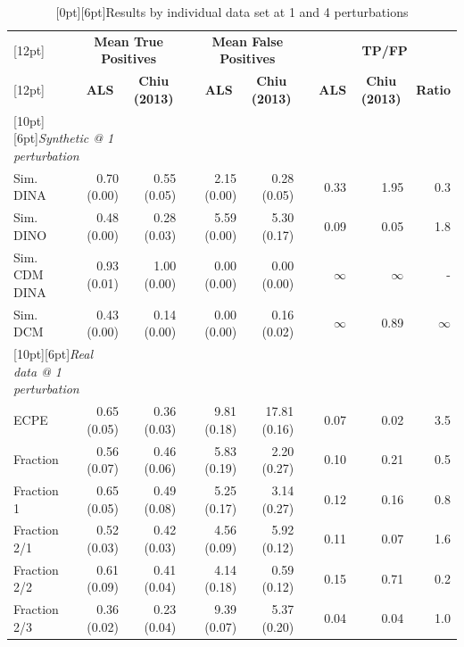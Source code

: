 \begin{table} 
  \caption{\protect\raisebox{0pt}[0pt][6pt]{Results by individual data set at 1 and 4 perturbations}}
  \label{tab:details}
\centering
\begin{tabular}{lrrrrrrrrr}
  \hline
  \hline
\raisebox{0pt}[12pt]{~}  & \multicolumn{2}{c}{\textbf{Mean True Positives}} && \multicolumn{2}{c}{\textbf{Mean False Positives}} && \multicolumn{3}{c}{\textbf{TP/FP}}\\
  \cline{2-3} \cline{5-6} \cline{8-10}
\raisebox{0pt}[12pt]{~}   
& \multicolumn{1}{c}{\textbf{ALS}} 
& \multicolumn{1}{c}{\textbf{Chiu (2013)}} 
&
& \multicolumn{1}{c}{\textbf{ALS}} 
& \multicolumn{1}{c}{\textbf{Chiu (2013)}} 
&
& \multicolumn{1}{c}{\textbf{ALS}} 
& \multicolumn{1}{c}{\textbf{Chiu (2013)}} 
& \multicolumn{1}{c}{\textbf{Ratio}} 
\\
  \hline
  \hline
  \multicolumn{2}{l}{\raisebox{0pt}[10pt][6pt]{\textit{Synthetic @ 1 perturbation}}}\\ 
  Sim. DINA & 0.70 (0.00) & 0.55 (0.05) && 2.15 (0.00) & 0.28 (0.05) && 0.33 & 1.95 & 0.3\\ 
  Sim. DINO & 0.48 (0.00) & 0.28 (0.03) && 5.59 (0.00) & 5.30 (0.17) &&  0.09 & 0.05 & 1.8\\ 
  Sim. CDM DINA & 0.93 (0.01) & 1.00 (0.00) && 0.00 (0.00) & 0.00 (0.00) && $\infty$ & $\infty$ & -\\ 
  Sim. DCM & 0.43 (0.00) & 0.14 (0.00) && 0.00 (0.00) & 0.16 (0.02)  && $\infty$ & 0.89 &  $\infty$\\ 
  \hline
  \multicolumn{2}{l}{\raisebox{0pt}[10pt][6pt]{\textit{Real data @ 1 perturbation}}}\\
  ECPE & 0.65 (0.05) & 0.36 (0.03) && 9.81 (0.18) & 17.81 (0.16) && 0.07 & 0.02 & 3.5\\ 
  Fraction & 0.56 (0.07) & 0.46 (0.06) && 5.83 (0.19) & 2.20 (0.27) &&  0.10& 0.21 & 0.5\\ 
  Fraction 1 & 0.65 (0.05) & 0.49 (0.08) && 5.25 (0.17) & 3.14 (0.27) &&  0.12 & 0.16 & 0.8\\ 
  Fraction 2/1 & 0.52 (0.03) & 0.42 (0.03) && 4.56 (0.09) & 5.92 (0.12) &&  0.11 & 0.07 & 1.6\\ 
  Fraction 2/2 & 0.61 (0.09) & 0.41 (0.04) && 4.14 (0.18) & 0.59 (0.12) &&  0.15 & 0.71 & 0.2\\ 
  Fraction 2/3 & 0.36 (0.02) & 0.23 (0.04) && 9.39 (0.07) & 5.37 (0.20) &&  0.04 & 0.04 & 1.0\\ 


\end{tabular}
\end{table}
